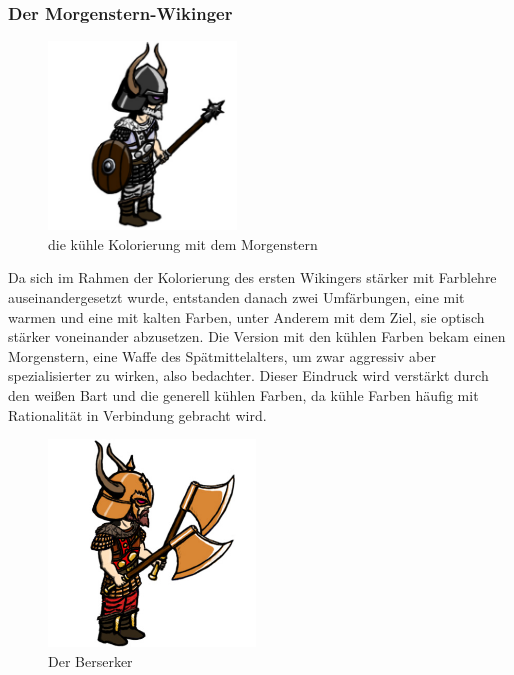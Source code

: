 \documentclass[extern,palatino]{cgBA}
\begin{document}
\subsubsection{Der Morgenstern-Wikinger}
\begin{figure}[H]
	\centering
	\includegraphics[height=5cm]{morningstar.jpg}
	\caption{die kühle Kolorierung mit dem Morgenstern}
	\label{morningstar}
\end{figure}
Da sich im Rahmen der Kolorierung des ersten Wikingers stärker mit Farblehre auseinandergesetzt wurde, entstanden danach zwei Umfärbungen, eine mit warmen und eine mit kalten Farben, unter Anderem mit dem Ziel, sie optisch stärker voneinander abzusetzen. Die Version mit den kühlen Farben bekam einen Morgenstern, eine Waffe des Spätmittelalters, um zwar aggressiv aber spezialisierter zu wirken, also bedachter. Dieser Eindruck wird verstärkt durch den weißen Bart und die generell kühlen Farben, da kühle Farben häufig mit Rationalität in Verbindung gebracht wird.
\newpage
\begin{figure}[H]
	\centering
	\includegraphics[height=5.5cm]{berserker.jpg}
	\caption{Der Berserker}
	\label{berserker}
\end{figure}
\end{document}
